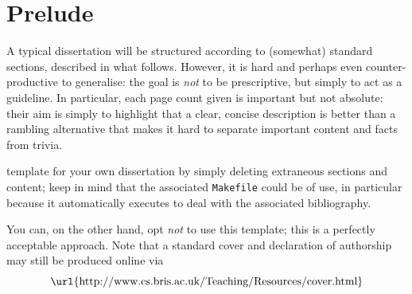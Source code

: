 \documentclass[ %
                    author={Jonathan Rankin},
                supervisor={Dr. David May, Dr. Ian Holyer},
                    degree={MEng},
                     title={CodeTouch},
                  subtitle={A Revolutionary Way To Program Real Code On Touch Screen Devices},
                      type={enterprise},
                      year={2015 } ]{dissertation}
\begin{document}


\section*{Prelude}
\thispagestyle{empty}


A typical dissertation will be structured according to (somewhat) standard 
sections, described in what follows.  However, it is hard and perhaps even 
counter-productive to generalise: the goal is {\em not} to be prescriptive, 
but simply to act as a guideline.  In particular, each page count given is
important but not absolute: their aim is simply to highlight that a clear, 
concise description is better than a rambling alternative that makes it 
hard to separate important content and facts from trivia.

template for your own dissertation by simply deleting extraneous sections
and content; keep in mind that the associated {\tt Makefile} could be of
use, in particular because it automatically executes \mbox{\BibTeX} to 
deal with the associated bibliography.  

You can, on the other hand, opt {\em not} to use this template; this is a 
perfectly acceptable approach.  Note that a standard cover and declaration 
of authorship may still be produced online via
\[
\mbox{\url{http://www.cs.bris.ac.uk/Teaching/Resources/cover.html}}
\]



\maketitle

\end{document}
